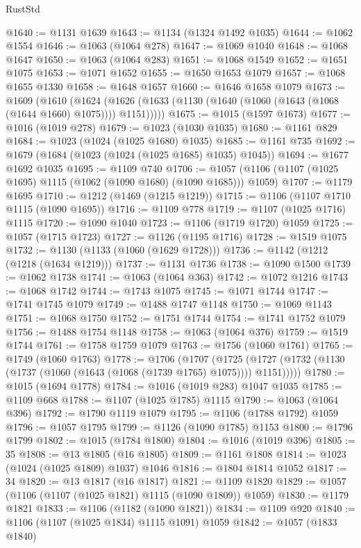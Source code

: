 \begin{lexlean}{RustStd}
\begin{coremodule}
@1640 := @1131 @1639
@1643 := @1134 (@1324 @1492 @1035)
@1644 := @1062 @1554
@1646 := @1063 (@1064 @278)
@1647 := @1069 @1040
@1648 := @1068 @1647
@1650 := @1063 (@1064 @283)
@1651 := @1068 @1549
@1652 := @1651 @1075
@1653 := @1071 @1652
@1655 := @1650 @1653 @1079
@1657 := @1068 @1655 @1330
@1658 := @1648 @1657
@1660 := @1646 @1658 @1079
@1673 := @1609
    (@1610
      (@1624 (@1626 (@1633 (@1130 (@1640 (@1060 (@1643 (@1068 (@1644 @1660) @1075)))) @1151)))))
@1675 := @1015 (@1597 @1673)
@1677 := @1016 (@1019 @278)
@1679 := @1023 (@1030 @1035)
@1680 := @1161 @829
@1684 := @1023 (@1024 (@1025 @1680) @1035)
@1685 := @1161 @735
@1692 := @1679 (@1684 (@1023 (@1024 (@1025 @1685) @1035) @1045))
@1694 := @1677 @1692 @1035
@1695 := @1109 @740
@1706 := @1057 (@1106 (@1107 (@1025 @1695) @1115 (@1062 (@1090 @1680) (@1090 @1685))) @1059)
@1707 := @1179 @1695
@1710 := @1212 (@1469 (@1215 @1219))
@1715 := @1106 (@1107 @1710 @1115 (@1090 @1695))
@1716 := @1109 @778
@1719 := @1107 (@1025 @1716) @1115
@1720 := @1090 @1040
@1723 := @1106 (@1719 @1720) @1059
@1725 := @1057 (@1715 @1723)
@1727 := @1126 (@1195 @1716)
@1728 := @1519 @1075
@1732 := @1130 (@1133 (@1060 (@1629 @1728)))
@1736 := @1142 (@1212 (@1218 (@1634 @1219)))
@1737 := @1131 @1736
@1738 := @1090 @1500
@1739 := @1062 @1738
@1741 := @1063 (@1064 @363)
@1742 := @1072 @1216
@1743 := @1068 @1742
@1744 := @1743 @1075
@1745 := @1071 @1744
@1747 := @1741 @1745 @1079
@1749 := @1488 @1747 @1148
@1750 := @1069 @1143
@1751 := @1068 @1750
@1752 := @1751 @1744
@1754 := @1741 @1752 @1079
@1756 := @1488 @1754 @1148
@1758 := @1063 (@1064 @376)
@1759 := @1519 @1744
@1761 := @1758 @1759 @1079
@1763 := @1756 (@1060 @1761)
@1765 := @1749 (@1060 @1763)
@1778 := @1706
    (@1707
      (@1725 (@1727 (@1732 (@1130 (@1737 (@1060 (@1643 (@1068 (@1739 @1765) @1075)))) @1151)))))
@1780 := @1015 (@1694 @1778)
@1784 := @1016 (@1019 @283) @1047 @1035
@1785 := @1109 @668
@1788 := @1107 (@1025 @1785) @1115
@1790 := @1063 (@1064 @396)
@1792 := @1790 @1119 @1079
@1795 := @1106 (@1788 @1792) @1059
@1796 := @1057 @1795
@1799 := @1126 (@1090 @1785) @1153
@1800 := @1796 @1799
@1802 := @1015 (@1784 @1800)
@1804 := @1016 (@1019 @396)
@1805 := 35
@1808 := @13 @1805 (@16 @1805)
@1809 := @1161 @1808
@1814 := @1023 (@1024 (@1025 @1809) @1037) @1046
@1816 := @1804 @1814 @1052
@1817 := 34
@1820 := @13 @1817 (@16 @1817)
@1821 := @1109 @1820
@1829 := @1057 (@1106 (@1107 (@1025 @1821) @1115 (@1090 @1809)) @1059)
@1830 := @1179 @1821
@1833 := @1106 (@1182 (@1090 @1821))
@1834 := @1109 @920
@1840 := @1106 (@1107 (@1025 @1834) @1115 @1091) @1059
@1842 := @1057 (@1833 @1840)

\end{coremodule}
\end{lexlean}
